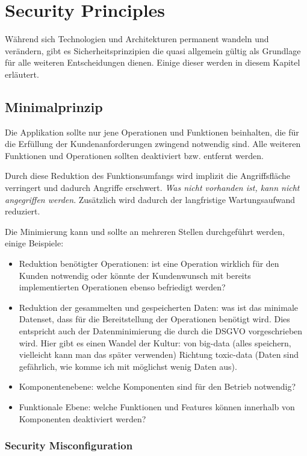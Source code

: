\chapter{Security Principles}

Während sich Technologien und Architekturen permanent wandeln und verändern, gibt es Sicherheitsprinzipien die quasi allgemein gültig als Grundlage für alle weiteren Entscheidungen dienen. Einige dieser werden in diesem Kapitel erläutert.

\section{Minimalprinzip}

Die Applikation sollte nur jene Operationen und Funktionen beinhalten, die für die Erfüllung der Kundenanforderungen zwingend notwendig sind. Alle weiteren Funktionen und Operationen sollten deaktiviert bzw. entfernt werden.

Durch diese Reduktion des Funktionsumfangs wird implizit die Angriffsfläche verringert und dadurch Angriffe erschwert. \textit{Was nicht vorhanden ist, kann nicht angegriffen werden}. Zusätzlich wird dadurch der langfristige Wartungsaufwand reduziert.

Die Minimierung kann und sollte an mehreren Stellen durchgeführt werden, einige Beispiele:

\begin{itemize}
	\item Reduktion benötigter Operationen: ist eine Operation wirklich für den Kunden notwendig oder könnte der Kundenwunsch mit bereits implementierten Operationen ebenso befriedigt werden?
	\item Reduktion der gesammelten und gespeicherten Daten: was ist das minimale Datenset, dass für die Bereitstellung der Operationen benötigt wird. Dies entspricht auch der Datenminimierung die durch die DSGVO vorgeschrieben wird. Hier gibt es einen Wandel der Kultur: von big-data (alles speichern, vielleicht kann man das später verwenden) Richtung toxic-data (Daten sind gefährlich, wie komme ich mit möglichst wenig Daten aus).
	\item Komponentenebene: welche Komponenten sind für den Betrieb notwendig?
	\item Funktionale Ebene: welche Funktionen und Features können innerhalb von Komponenten deaktiviert werden?
\end{itemize}

\subsection{Security Misconfiguration}

